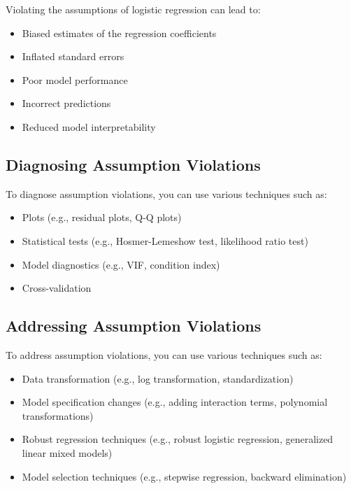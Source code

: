 \documentclass[12pt]{book}
\providecommand{\tightlist}{%
  \setlength{\itemsep}{0pt}\setlength{\parskip}{0pt}}
\begin{document}
Violating the assumptions of logistic regression can lead to:

\begin{itemize}
\tightlist
\item
  Biased estimates of the regression coefficients
\item
  Inflated standard errors
\item
  Poor model performance
\item
  Incorrect predictions
\item
  Reduced model interpretability
\end{itemize}

\subsection{\texorpdfstring{\textbf{Diagnosing Assumption
Violations}}{Diagnosing Assumption Violations}}\label{diagnosing-assumption-violations}

To diagnose assumption violations, you can use various techniques such
as:

\begin{itemize}
\tightlist
\item
  Plots (e.g., residual plots, Q-Q plots)
\item
  Statistical tests (e.g., Hosmer-Lemeshow test, likelihood ratio test)
\item
  Model diagnostics (e.g., VIF, condition index)
\item
  Cross-validation
\end{itemize}

\subsection{\texorpdfstring{\textbf{Addressing Assumption
Violations}}{Addressing Assumption Violations}}\label{addressing-assumption-violations}

To address assumption violations, you can use various techniques such
as:

\begin{itemize}
\tightlist
\item
  Data transformation (e.g., log transformation, standardization)
\item
  Model specification changes (e.g., adding interaction terms,
  polynomial transformations)
\item
  Robust regression techniques (e.g., robust logistic regression,
  generalized linear mixed models)
\item
  Model selection techniques (e.g., stepwise regression, backward
  elimination)
\end{itemize}
\end{document}
